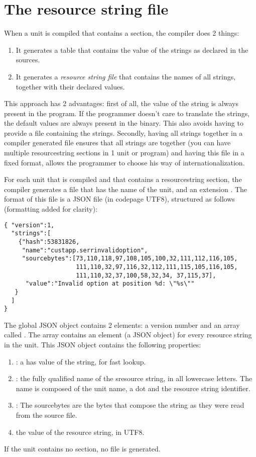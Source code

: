 \section{The resource string file}
When a unit is compiled that contains a  section,
the compiler does 2 things:
\begin{enumerate}
\item It generates a table that contains the value of the strings as declared in the sources.
\item It generates a {\em resource string file} that contains the names
of all strings, together with their declared values.
\end{enumerate}
This approach has 2 advantages: first of all, the value of the string is
always present in the program. If the programmer doesn't care to translate
the strings, the default values are always present in the binary. This also
avoids having to provide a file containing the strings. Secondly, having all
strings together in a compiler generated file ensures that all strings are
together (you can have multiple resourcestring sections in 1 unit or program)
and having this file in a fixed format, allows the programmer to choose his
way of internationalization.

For each unit that is compiled and that contains a resourcestring section,
the compiler generates a file that has the name of the unit, and an
extension . The format of this file is a JSON file (in codepage UTF8), 
structured as follows (formatting added for clarity):
\begin{verbatim}
{ "version":1,
  "strings":[
    {"hash":53831826,
     "name":"custapp.serrinvalidoption",
     "sourcebytes":[73,110,118,97,108,105,100,32,111,112,116,105,
                    111,110,32,97,116,32,112,111,115,105,116,105,
                    111,110,32,37,100,58,32,34, 37,115,37],
      "value":"Invalid option at position %d: \"%s\""
   }
  ]
}
\end{verbatim}
The global JSON  object contains 2 elements: a version number and an array
called . The array contains an element (a JSON object) for every resource string in the
unit. This JSON object contains the following properties:
\begin{enumerate}
\item {}: a has value of the string, for fast lookup.
\item {}: the fully qualified name of the sresource string, in all lowercase letters. 
The name is composed of the unit name, a dot and the resource string
identifier.
\item {}: The sourcebytes are the bytes that compose the string as they
were read from the source file.
\item {} the value of the resource string, in UTF8.
\end{enumerate}
If the unit contains no  section, no file is generated.


